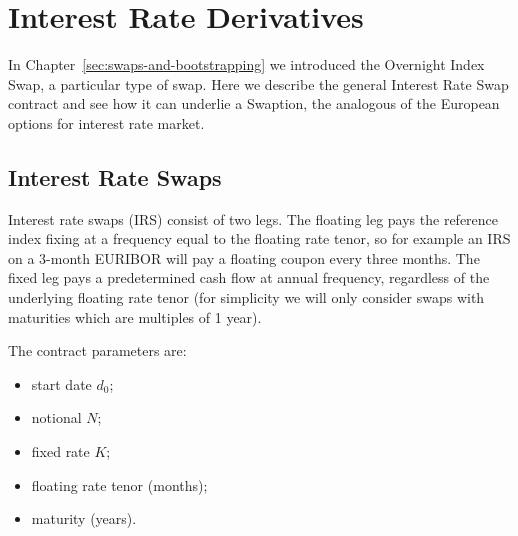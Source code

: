 \chapter{Interest Rate Derivatives}
\label{interest-rate-swaps-and-swaptions}

In Chapter~\ref{sec:swaps-and-bootstrapping} we introduced the Overnight Index Swap, a particular type of swap. Here we describe the general Interest Rate Swap contract and see how it can underlie a Swaption, the analogous of the European options for interest rate market.

\section{Interest Rate Swaps}\label{interest-rate-swaps}

Interest rate swaps (IRS) consist of two legs. The floating leg pays the reference index fixing at a frequency equal to the floating rate tenor, so for example an IRS on a 3-month EURIBOR will pay a floating coupon every three months.
The fixed leg pays a predetermined cash flow at annual frequency, regardless of the underlying floating rate tenor (for simplicity we will only consider swaps with maturities which are multiples of 1 year).

The contract parameters are:

\begin{itemize}
\tightlist
\item start date $d_0$;
\item notional $N$;
\item fixed rate $K$;
\item floating rate tenor (months);
\item maturity (years).
\end{itemize}

